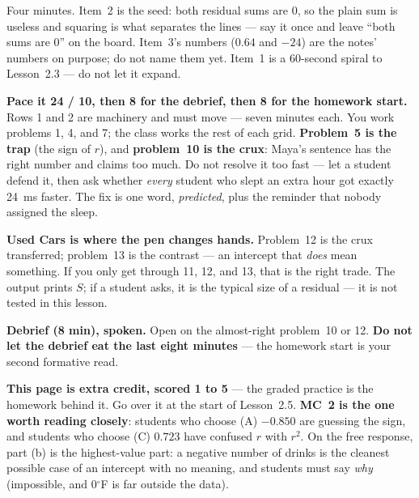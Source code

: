 \documentclass[10pt]{article}
\begin{document}
\begin{teachernote}[Warm-Up]
Four minutes. Item~2 is the seed: both residual sums are 0, so the plain sum is useless and
squaring is what separates the lines --- say it once and leave ``both sums are 0'' on the board.
Item~3's numbers ($0.64$ and $-24$) are the notes' numbers on purpose; do not name them yet.
Item~1 is a 60-second spiral to Lesson~2.3 --- do not let it expand.
\end{teachernote}

\begin{teachernote}
\textbf{Pace it 24 / 10, then 8 for the debrief, then 8 for the homework start.} Rows 1 and 2 are
machinery and must move --- seven minutes each. You work problems 1, 4, and 7; the class works
the rest of each grid. \textbf{Problem~5 is the trap} (the sign of $r$), and \textbf{problem~10
is the crux}: Maya's sentence has the right number and claims too much. Do not resolve it too
fast --- let a student defend it, then ask whether \emph{every} student who slept an extra hour
got exactly 24~ms faster. The fix is one word, \emph{predicted}, plus the reminder that nobody
assigned the sleep.

\textbf{Used Cars is where the pen changes hands.} Problem~12 is the crux transferred;
problem~13 is the contrast --- an intercept that \emph{does} mean something. If you only get
through 11, 12, and 13, that is the right trade. The output prints $S$; if a student asks, it is
the typical size of a residual --- it is not tested in this lesson.

\textbf{Debrief (8 min), spoken.} Open on the almost-right problem~10 or 12. \textbf{Do not let
the debrief eat the last eight minutes} --- the homework start is your second formative read.
\end{teachernote}

\begin{teachernote}[AP Practice]
\textbf{This page is extra credit, scored 1 to 5} --- the graded practice is the homework behind
it. Go over it at the start of Lesson~2.5. \textbf{MC~2 is the one worth reading closely}:
students who choose (A) $-0.850$ are guessing the sign, and students who choose (C) $0.723$
have confused $r$ with $r^2$. On the free response, part (b) is the highest-value part: a
negative number of drinks is the cleanest possible case of an intercept with no meaning, and
students must say \emph{why} (impossible, and 0$^\circ$F is far outside the data).
\end{teachernote}
\end{document}
